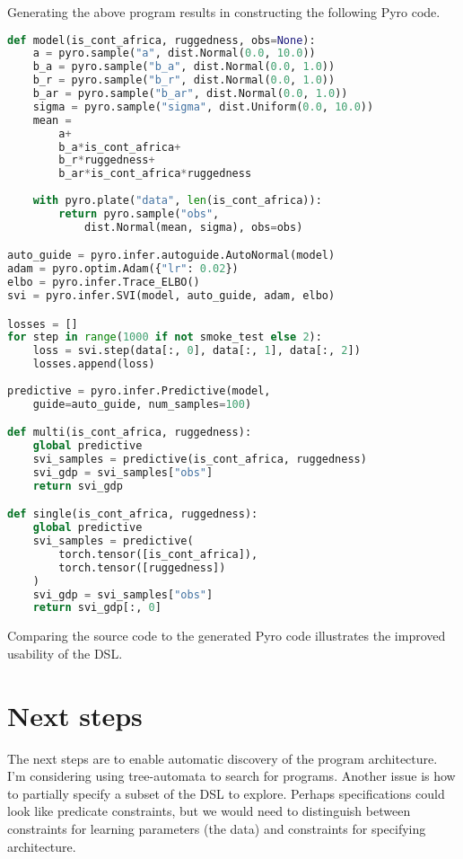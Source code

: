 \documentclass[runningheads]{llncs}
\begin{document}
\noindent
Generating the above program results in constructing the following Pyro code.
\begin{lstlisting}[language=Python]
def model(is_cont_africa, ruggedness, obs=None):
    a = pyro.sample("a", dist.Normal(0.0, 10.0))
    b_a = pyro.sample("b_a", dist.Normal(0.0, 1.0))
    b_r = pyro.sample("b_r", dist.Normal(0.0, 1.0))
    b_ar = pyro.sample("b_ar", dist.Normal(0.0, 1.0))
    sigma = pyro.sample("sigma", dist.Uniform(0.0, 10.0))
    mean = 
        a+
        b_a*is_cont_africa+
        b_r*ruggedness+
        b_ar*is_cont_africa*ruggedness
    
    with pyro.plate("data", len(is_cont_africa)):
        return pyro.sample("obs", 
            dist.Normal(mean, sigma), obs=obs)

auto_guide = pyro.infer.autoguide.AutoNormal(model)
adam = pyro.optim.Adam({"lr": 0.02}) 
elbo = pyro.infer.Trace_ELBO()
svi = pyro.infer.SVI(model, auto_guide, adam, elbo)

losses = []
for step in range(1000 if not smoke_test else 2): 
    loss = svi.step(data[:, 0], data[:, 1], data[:, 2])
    losses.append(loss)
        
predictive = pyro.infer.Predictive(model, 
    guide=auto_guide, num_samples=100)

def multi(is_cont_africa, ruggedness):
    global predictive 
    svi_samples = predictive(is_cont_africa, ruggedness)
    svi_gdp = svi_samples["obs"]
    return svi_gdp

def single(is_cont_africa, ruggedness):
    global predictive 
    svi_samples = predictive(
        torch.tensor([is_cont_africa]), 
        torch.tensor([ruggedness])
    )
    svi_gdp = svi_samples["obs"]
    return svi_gdp[:, 0]
\end{lstlisting}

\noindent
Comparing the source code to the generated Pyro code illustrates the improved usability of the DSL. 

\section{Next steps}
The next steps are to enable automatic discovery of the program architecture. 
I'm considering using tree-automata to search for programs. 
Another issue is how to partially specify a subset of the DSL to explore. 
Perhaps specifications could look like predicate constraints, but we would need to distinguish between
constraints for learning parameters (the data) and constraints for specifying architecture. 
\end{document}
